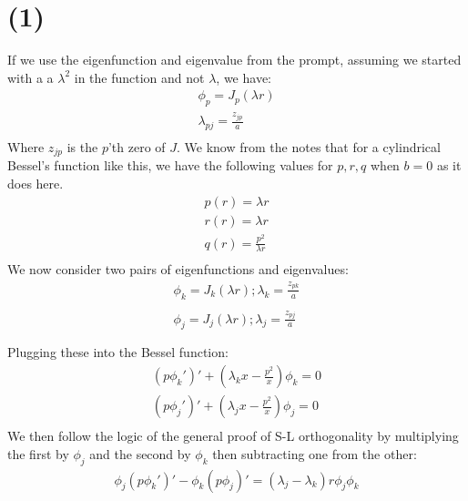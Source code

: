 \documentclass{article}
\begin{document}
\section*{\textbf{(1)}}
If we use the eigenfunction and eigenvalue from the prompt, assuming we started with a a $\lambda^2$ in the function and not $\lambda$, we have:
\begin{equation}
\begin{aligned}
\phi_p = J_p(\lambda r)\\
\lambda_{pj} = \frac{z_{jp}}{a}\\
\end{aligned}
\end{equation}
Where $z_{jp}$ is the $p$'th zero of $J$. We know from the notes that for a cylindrical Bessel's function like this, we have the following values for $p,r,q$ when $b=0$ as it does here. 
\begin{equation}
\begin{aligned}
p(r) = \lambda r\\
r(r) = \lambda r\\
q(r) = \frac{p^2}{\lambda r}\\
\end{aligned}
\end{equation}
We now consider two pairs of eigenfunctions and eigenvalues:
\begin{equation}
\begin{aligned}
\phi_k = J_k(\lambda r); \lambda_k =\frac{z_{pk}}{a}\\ \\
\phi_j = J_j(\lambda r); \lambda_j =\frac{z_{pj}}{a}\\ \\
\end{aligned}
\end{equation}
Plugging these into the Bessel function:
\begin{equation}
\begin{aligned}
(p\phi_k')' + (\lambda_k x - \frac{p^2}{x})\phi_k = 0\\
(p\phi_j')' + (\lambda_j x - \frac{p^2}{x})\phi_j = 0\\
\end{aligned}
\end{equation}
We then follow the logic of the general proof of S-L orthogonality by multiplying the first by $\phi_j$ and the second by $\phi_k$ then subtracting one from the other:
\begin{equation}
\begin{aligned}
\phi_j(p\phi_k')' - \phi_k(p\phi_j)' = (\lambda_j - \lambda_k)r\phi_j\phi_k
\end{aligned}
\end{equation}
\end{document}
